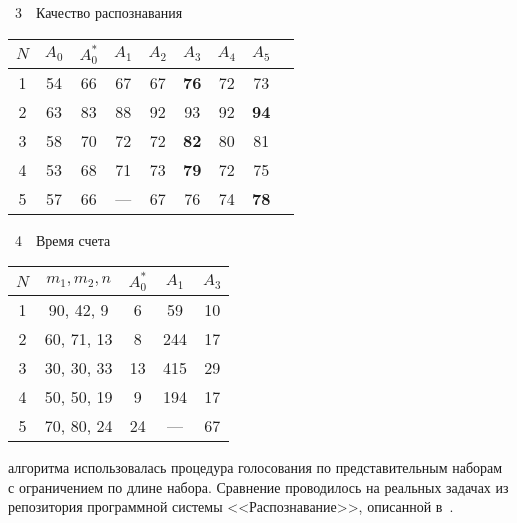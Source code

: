 \begin{multicols}{2}
\vspace*{5pt}
\begin{center}
{{\tablename~3}\ \ \small{Качество распознавания}}
\end{center}
{\small
      \begin{center}
      \begin{tabular}{|c|c|c|c|c|c|c|c|c|}
\hline
$N$ & $A_0$ &$A^*_0$ & $A_1$ & $A_2$ & $A_3$ & $A_4$ & $A_5$ \\
\hline
1 & 54& 66 & 67 & 67 & \textbf{76} & 72 & 73 \\
2 & 63& 83 & 88 & 92 & 93 & 92 & \textbf{94} \\
3 & 58& 70 & 72 & 72 & \textbf{82} & 80 & 81 \\
4 & 53& 68 & 71 & 73 & \textbf{79} & 72 & 75\\
5 & 57& 66 & --- & 67 & 76 & 74 & \textbf{78}\\
\hline
\end{tabular}
\end{center}}
\addtocounter{table}{1}


\vspace*{5pt}
\begin{center}
{{\tablename~4}\ \ \small{Время счета}}
\end{center}
{\small
      \begin{center}
\begin{tabular}{|c|c|c|c|c|}
\hline
$N$ & $m_1, m_2, n$ & $A^*_0$ & $A_1$ & $A_3$ \\
\hline
1 & 90, 42, 9\hphantom{9} &  6 &  \hphantom{9}59 & 10 \\
2 & 60, 71, 13 &  8 & 244 & 17 \\
3 & 30, 30, 33 & 13\hphantom{9} & 415 & 29 \\
4 & 50, 50, 19 &  9 & 194 & 17 \\
5 & 70, 80, 24 & 24\hphantom{9} & --- & 67 \\
\hline
\end{tabular}
\end{center}}

\vspace{12pt}

\addtocounter{table}{1}



\noindent
 алгоритма
использовалась процедура голосования по представительным наборам с
ограничением по длине набора. Сравнение проводилось на реальных
задачах из репозитория программной системы <<Распознавание>>,
описанной в~\cite{a3}.


\end{multicols}

